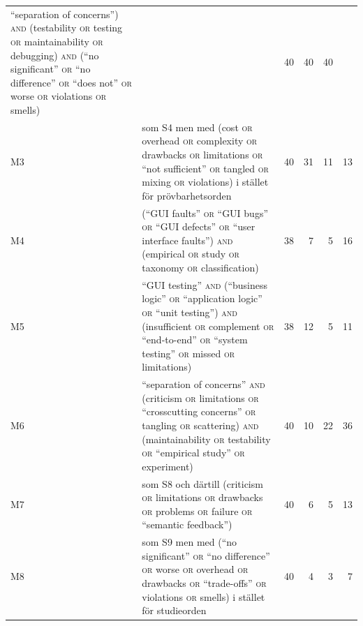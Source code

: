 \begin{table}[htbp]
\begin{tabularx}{\linewidth}{@{}l>{\raggedright\arraybackslash}X rrrr@{}}
         \enquote{separation of concerns}) \textsc{and} (testability
         \textsc{or} testing \textsc{or} maintainability \textsc{or}
         debugging) \textsc{and} (\enquote{no significant} \textsc{or}
         \enquote{no difference} \textsc{or} \enquote{does not}
         \textsc{or} worse \textsc{or} violations \textsc{or} smells)
       & 40 & 40 & 40 & 40 \\
    M3 & som S4 men med (cost \textsc{or} overhead \textsc{or}
         complexity \textsc{or} drawbacks \textsc{or} limitations
         \textsc{or} \enquote{not sufficient} \textsc{or} tangled
         \textsc{or} mixing \textsc{or} violations) i stället för
         prövbarhetsorden
       & 40 & 31 & 11 & 13 \\
    M4 & (\enquote{GUI faults} \textsc{or} \enquote{GUI bugs} \textsc{or}
         \enquote{GUI defects} \textsc{or} \enquote{user interface
         faults}) \textsc{and} (empirical \textsc{or} study \textsc{or}
         taxonomy \textsc{or} classification)
       & 38 & 7 & 5 & 16 \\
    M5 & \enquote{GUI testing} \textsc{and} (\enquote{business logic}
         \textsc{or} \enquote{application logic} \textsc{or} \enquote{unit
         testing}) \textsc{and} (insufficient \textsc{or} complement
         \textsc{or} \enquote{end-to-end} \textsc{or} \enquote{system
         testing} \textsc{or} missed \textsc{or} limitations)
       & 38 & 12 & 5 & 11 \\
    M6 & \enquote{separation of concerns} \textsc{and} (criticism
         \textsc{or} limitations \textsc{or} \enquote{crosscutting
         concerns} \textsc{or} tangling \textsc{or} scattering)
         \textsc{and} (maintainability \textsc{or} testability
         \textsc{or} \enquote{empirical study} \textsc{or} experiment)
       & 40 & 10 & 22 & 36 \\
    M7 & som S8 och därtill (criticism \textsc{or} limitations
         \textsc{or} drawbacks \textsc{or} problems \textsc{or} failure
         \textsc{or} \enquote{semantic feedback})
       & 40 & 6 & 5 & 13 \\
    M8 & som S9 men med (\enquote{no significant} \textsc{or} \enquote{no
         difference} \textsc{or} worse \textsc{or} overhead \textsc{or}
         drawbacks \textsc{or} \enquote{trade-offs} \textsc{or}
         violations \textsc{or} smells) i stället för studieorden
       & 40 & 4 & 3 & 7 \\
    \bottomrule
  \end{tabularx}
\end{table}


